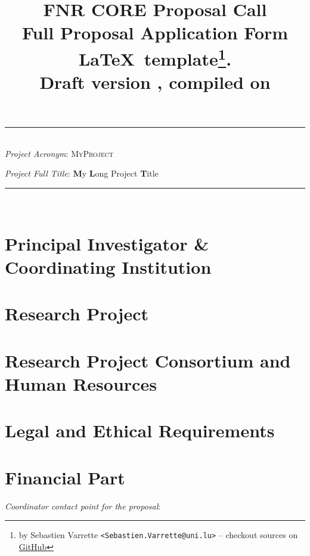\documentclass[11pt,twoside,a4paper]{article}
\title{\textbf{\Large FNR CORE Proposal Call} \\[1em]
  {\small Full Proposal Application Form \LaTeX\ template\thanks{by Sebastien
      Varrette {\small \texttt{<Sebastien.Varrette@uni.lu>}} -- checkout sources
      on \href{https://github.com/Falkor/fnr-latex-template}{GitHub}}.\\
    \textbf{Draft version \docversion}, compiled on \isodayandtime}
}
\author{}
\date{}
\newcommand{\project}{\textsc{MyProject}\xspace}
\newcommand{\fulltitle}{\textbf{M}y \textbf{L}ong \textsc{P}roject \textbf{T}itle\xspace}
\begin{document}
\maketitle
{\Large
  \begin{center}
      \hrule
      ~\\
      \emph{Project Acronym}: \project

      \emph{Project Full Title}: \fulltitle\\[1em]
  \end{center}
}
\hrule
~\\[1em]

\clearpage
\tableofcontents
\clearpage

\section{Principal Investigator \& Coordinating Institution}


\section{Research Project}

  
\section{Research Project Consortium and Human Resources}

  
\section{Legal and Ethical Requirements}


\section{Financial Part}



\clearpage


  
\emph{Coordinator contact point for the proposal}:
\end{document}
